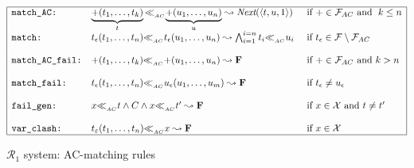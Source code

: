 \documentclass[submission,copyright,creativecommons]{eptcs}
\newcommand \matchth[3]{#1 {\ll}_{{ }_{#3}} {#2}}
\newcommand \matchAC[2]{\matchth{#1}{#2}{AC}}
\newcommand \trip[1]{\langle #1 \rangle}
\numberwithin{subcase}{case}
\begin{document}
\begin{figure}[htb!]
\begin{align*}
 \begin{array}{@{}|l  l  l|@{}}
\hline  
\texttt{match\_AC:} 
&\matchAC{\underbrace{+(t_1,\ldots,t_k)}_{t}}{\underbrace{+(u_1,\ldots,u_n)}_{u}}
  \leadsto {\textit{Next}(\trip{t,u,1})}  
 & \textrm{ if } + \in \mathcal{F}_{AC} \textrm{ and } \;  k\le n \\
\texttt{match:} 
 &\matchAC{t_{\epsilon}(t_1,\ldots,t_n)}{t_{\epsilon}(u_1,\ldots,u_n)} \leadsto 
  \bigwedge_{i = 1}^{i = n} \matchAC{t_i}{u_i}
  & \textrm{ if }t_{\epsilon}\in \mathcal{F} \setminus \mathcal{F}_{AC}\\
&&\\
\texttt{match\_AC\_fail:} 
 &\matchAC{+(t_1,\ldots,t_k)}{+(u_1,\ldots,u_n)} \leadsto 
  \textbf{F} 
&\textrm{ if } + \in \mathcal{F}_{AC} \textrm{ and } k > n \\
&&\\
\texttt{match\_fail:}
 & \matchAC{t_{\epsilon}(t_1,\ldots,t_n)}{u_{\epsilon}(u_1,\ldots,u_m)}
    \leadsto \textbf{F} 
   & \textrm{ if } t_{\epsilon}\neq u_{\epsilon}\\ 
&&\\
\texttt{fail\_gen:} 
 &\matchAC{x}{t}\land C \land \matchAC{x}{t'} \leadsto \textbf{F} 
   & \textrm{ if }  x\in \mathcal{X} \textrm{ and } t \neq t'\\
&&\\
\texttt{var\_clash:} 
  & \matchAC{t_{\varepsilon}(t_1,\ldots,t_n)}{x}  \leadsto \textbf{F}  
   & \textrm{ if }  x\in \mathcal{X} \\
\hline
\end{array}
\end{align*}
\caption{$\mathcal{R}_1$ system: AC-matching rules \label{Matching-AC}}
\end{figure}
\end{document}
